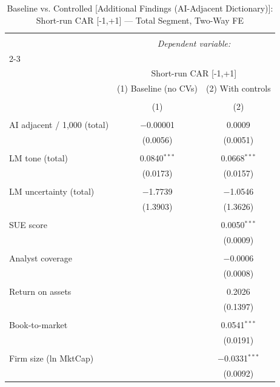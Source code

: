 
\begin{table}[!htbp] \centering 
  \caption{Baseline vs. Controlled [Additional Findings (AI-Adjacent Dictionary)]: Short-run CAR [-1,+1] — Total Segment, Two-Way FE} 
  \label{} 
\begin{tabular}{@{\extracolsep{5pt}}lcc} 
\\[-1.8ex]\hline 
\hline \\[-1.8ex] 
 & \multicolumn{2}{c}{\textit{Dependent variable:}} \\ 
\cline{2-3} 
\\[-1.8ex] & \multicolumn{2}{c}{Short-run CAR [-1,+1]} \\ 
 & (1) Baseline (no CVs) & (2) With controls \\ 
\\[-1.8ex] & (1) & (2)\\ 
\hline \\[-1.8ex] 
 AI adjacent / 1,000 (total) & $-$0.00001 & 0.0009 \\ 
  & (0.0056) & (0.0051) \\ 
  & & \\ 
 LM tone (total) & 0.0840$^{***}$ & 0.0668$^{***}$ \\ 
  & (0.0173) & (0.0157) \\ 
  & & \\ 
 LM uncertainty (total) & $-$1.7739 & $-$1.0546 \\ 
  & (1.3903) & (1.3626) \\ 
  & & \\ 
 SUE score &  & 0.0050$^{***}$ \\ 
  &  & (0.0009) \\ 
  & & \\ 
 Analyst coverage &  & $-$0.0006 \\ 
  &  & (0.0008) \\ 
  & & \\ 
 Return on assets &  & 0.2026 \\ 
  &  & (0.1397) \\ 
  & & \\ 
 Book-to-market &  & 0.0541$^{***}$ \\ 
  &  & (0.0191) \\ 
  & & \\ 
 Firm size (ln MktCap) &  & $-$0.0331$^{***}$ \\ 
  &  & (0.0092) \\ 

\end{tabular}
\end{table}
